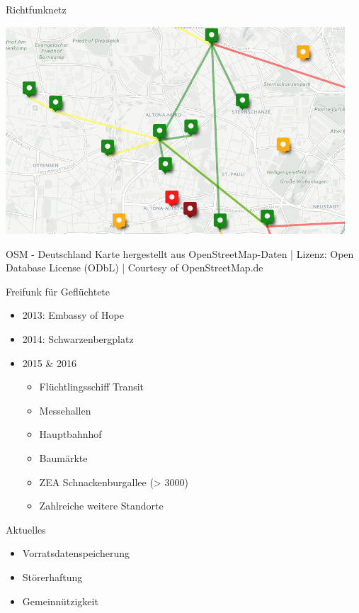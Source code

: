 \documentclass[t]{beamer}
\begin{document}
  \begin{frame}{Richtfunknetz}
    \begin{center}
      \includegraphics[width=0.95\textwidth]{Bilder/richtfunk-uebersicht}
    \end{center}
    \tiny{OSM - Deutschland Karte hergestellt aus OpenStreetMap-Daten | Lizenz: Open Database License (ODbL) | Courtesy of OpenStreetMap.de}
  \end{frame}
  
  \begin{frame}{Freifunk für Geflüchtete}
    \begin{itemize}
      \item 2013: Embassy of Hope
      \item 2014: Schwarzenbergplatz
      \item 2015 \& 2016
      \begin{itemize}
       \item Flüchtlingsschiff Transit
       \item Messehallen
       \item Hauptbahnhof
       \item Baumärkte
       \item ZEA Schnackenburgallee (> 3000)
       \item Zahlreiche weitere Standorte
      \end{itemize}
    \end{itemize}
  \end{frame}
  
  
  \begin{frame}{Aktuelles}
    \begin{itemize}
      \item Vorratsdatenspeicherung
      \item Störerhaftung
      \item Gemeinnützigkeit
    \end{itemize}
  \end{frame}
    
\end{document}
